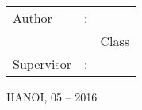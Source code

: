 \begin{titlepage}
\begin{center}
		\vspace{40pt}

		\raggedleft
		\begin{minipage}{0.6\linewidth}
			\fontsize{14}{16pt}\selectfont
			\begin{tabular}{ l c l }
			Author & : & \textbf{\thesisAuthor}\\
					& & Class \studentClass\\
			Supervisor & : & \textbf{\supervisor} \\
			\end{tabular}
		\end{minipage}
		\vfill
		\centering
		\fontsize{16}{16pt}\selectfont
		\MakeUppercase{Hanoi, 05 -- 2016}
	\end{center}
	\cleardoublepage
\end{titlepage}